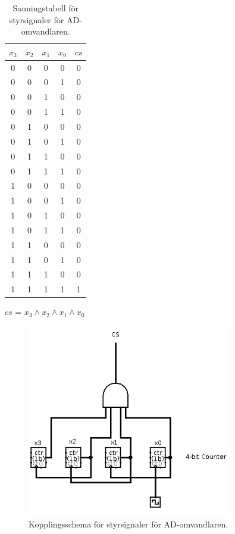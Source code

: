 \documentclass[a4paper,10pt]{article}
\begin{document}
\begin{table}
\centering
\begin{tabular}{| c c c c || c |}
\hline
$x_3$ & $x_2$ & $x_1$ & $x_0$ & $cs$ \\\hline
0 & 0 & 0 & 0 & 0 \\
0 & 0 & 0 & 1 & 0 \\
0 & 0 & 1 & 0 & 0 \\
0 & 0 & 1 & 1 & 0 \\
0 & 1 & 0 & 0 & 0 \\
0 & 1 & 0 & 1 & 0 \\
0 & 1 & 1 & 0 & 0 \\
0 & 1 & 1 & 1 & 0 \\
1 & 0 & 0 & 0 & 0 \\
1 & 0 & 0 & 1 & 0 \\
1 & 0 & 1 & 0 & 0 \\
1 & 0 & 1 & 1 & 0 \\
1 & 1 & 0 & 0 & 0 \\
1 & 1 & 0 & 1 & 0 \\
1 & 1 & 1 & 0 & 0 \\
1 & 1 & 1 & 1 & 1 \\
\hline
\end{tabular}

$cs$ = $x_3 \wedge x_2 \wedge x_1 \wedge x_0$

\caption{Sanningstabell för styrsignaler för AD-omvandlaren.}
\label{tab:adc}
\end{table}

\begin{figure}
\centering
\includegraphics[width=0.8\textwidth]{adccircuit.png}
\caption{Kopplingsschema för styrsignaler för AD-omvandlaren.}
\label{fig:adccircuit}
\end{figure}
\end{document}
